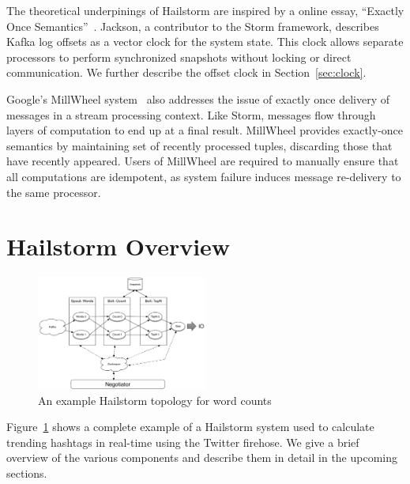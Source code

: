 \documentclass[10pt,nocopyrightspace]{sigplanconf}
\begin{document}
The theoretical underpinings of Hailstorm are inspired by a online essay,
``Exactly Once Semantics''~\cite{jackson2014}. Jackson, a contributor to the
Storm framework, describes Kafka log offsets as a vector clock for the system
state. This clock allows separate processors to perform synchronized snapshots
without locking or direct communication. We further describe the offset clock
in Section~\ref{sec:clock}.

Google's MillWheel system~\cite{millwheel} also addresses the issue of exactly
once delivery of messages in a stream processing context. Like Storm,
messages flow through layers of computation to end up at a final result.
MillWheel provides exactly-once semantics by maintaining set of recently
processed tuples, discarding those that have recently appeared. Users of
MillWheel are required to manually ensure that all computations are
idempotent, as system failure induces message re-delivery to the same processor.

\section{Hailstorm Overview}
\label{sec:overview}

\begin{figure}
\centering
\includegraphics[width=0.5\textwidth]{images/architecture.pdf}
\caption{An example Hailstorm topology for word counts}
\label{fig:topology}
\end{figure}

Figure~\ref{fig:topology} shows a complete example of a Hailstorm system used
to calculate trending hashtags in real-time using the Twitter firehose. We give
a brief overview of the various components and describe them in detail in the
upcoming sections.
\end{document}
